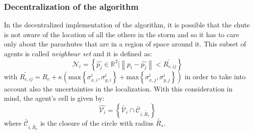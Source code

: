    \subsubsection{Decentralization of the algorithm} 
    In the decentralized implementation of the algorithm, it is possible that the chute is not aware of the location of all the others in the storm and so it has to care only about the parachutes that are in a region of space around it. This subset of agents is called \textit{neighbour set} and it is defined as:
    \begin{equation}
            \mathcal{N}_i = \left\{\hat{p_j} \in \mathbb{R}^2 \lvert \left\lVert p_i-\hat{p_j} \right\rVert < \tilde{R_{c,ij}} \right\}
            \label{eq:neighbour_set}
        \end{equation}
    with $\tilde{R_{c,ij}} = R_c + \kappa \left(\text{max}\left\{\sigma_{x,i}^i, \sigma_{y,i}^i\right\} + \text{max}\left\{\sigma_{x,j}^i, \sigma_{y,j}^i\right\}\right)$ in order to take into account also the uncertainties in the localization. With this consideration in mind, the agent's cell is given by:
        \begin{equation}
            \hat{\mathcal{V}_i}=\left\{\tilde{\mathcal{V}_i} \cap \bar{\mathcal{C}}_{i, \tilde{R_s}} \right\}
        \end{equation}
    where $\bar{\mathcal{C}}_{i, \tilde{R_s}}$ is the closure of the circle with radius $\tilde{R_s}$.  
    
